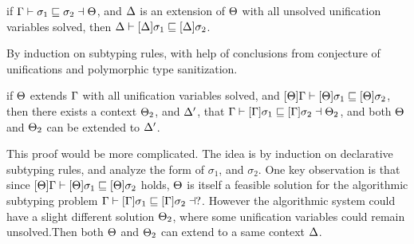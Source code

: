 \begin{conjecture}
  if $\Gamma {} \vdash \sigma_1 \sqsubseteq \sigma_2 \dashv \Theta$,
  and $\Delta$ is an extension of $\Theta$ with all unsolved unification
  variables solved,
  then $\Delta \vdash [\Delta] \sigma_1 \sqsubseteq [\Delta] \sigma_2$.
\end{conjecture}
\begin{hproof}
  By induction on subtyping rules, with help of conclusions from conjecture of
  unifications and polymorphic type sanitization.
\end{hproof}

\begin{conjecture}
  if $\Theta$ extends $\Gamma$ with all unification variables solved,
  and $[\Theta]\Gamma \vdash [\Theta] \sigma_1 \sqsubseteq [\Theta]\sigma_2$,
  then there exists a context $\Theta_2$, and $\Delta'$,
  that $\Gamma \vdash [\Gamma] \sigma_1 \sqsubseteq [\Gamma]\sigma_2 \dashv \Theta_2$,
  and both $\Theta$ and $\Theta_2$ can be extended to $\Delta'$.
\end{conjecture}
\begin{hproof}
  This proof would be more complicated. The idea is by induction on
  declarative subtyping rules, and analyze the form of $\sigma_1$, and
  $\sigma_2$. One key observation is that since $[\Theta]\Gamma \vdash [\Theta]
  \sigma_1 \sqsubseteq [\Theta]\sigma_2$ holds, $\Theta$ is itself a feasible solution for
  the algorithmic subtyping problem $\Gamma
  \vdash [\Gamma] \sigma_1 \sqsubseteq [\Gamma]\sigma_2 \dashv ?$. However the algorithmic
  system could have a slight different solution $\Theta_2$, where some
  unification variables could remain unsolved.Then both $\Theta$ and
  $\Theta_2$ can extend to a same context $\Delta$.
\end{hproof}